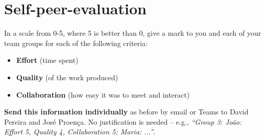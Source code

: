 \documentclass[11pt]{article}
\begin{document}





\section*{Self-peer-evaluation}
\begin{myExercise}
  In a scale from 0-5, where 5 is better than 0, give a mark to you and each of your team groups for each of the following criteria:
  \begin{itemize}
    \item \textbf{Effort} (time spent)
    \item \textbf{Quality} (of the work produced)
    \item \textbf{Collaboration} (how easy it was to meet and interact)
  \end{itemize}
  \textbf{Send this information individually} as before by email or Teams to David Pereira and Jos\'{e} Proen\c{c}a. No justification is needed -- e.g., \emph{``Group 3: Jo\~{a}o: Effort 5, Quality 4, Collaboration 5; Maria: ...''}.
\end{myExercise}


 
\end{document}
